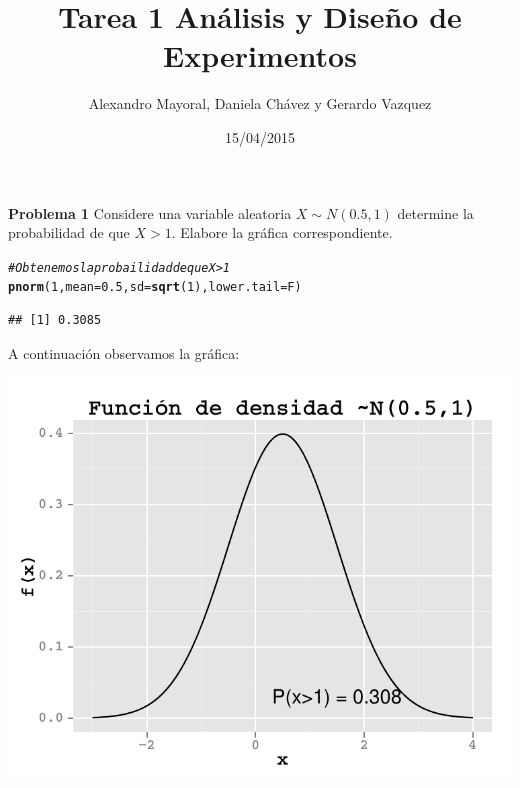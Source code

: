 \documentclass[a4paper]{scrartcl}\usepackage[]{graphicx}\usepackage[]{color}
\author{Alexandro Mayoral, Daniela Chávez y Gerardo Vazquez}
\title{Tarea 1 Análisis y Diseño de Experimentos}
\date{15/04/2015}
\makeatletter
\def\maxwidth{ %
  \ifdim\Gin@nat@width>\linewidth
    \linewidth
  \else
    \Gin@nat@width
  \fi
}
\newcommand{\hlnum}[1]{\textcolor[rgb]{0.686,0.059,0.569}{#1}}%
\newcommand{\hlcom}[1]{\textcolor[rgb]{0.678,0.584,0.686}{\textit{#1}}}%
\newcommand{\hlstd}[1]{\textcolor[rgb]{0.345,0.345,0.345}{#1}}%
\newcommand{\hlkwc}[1]{\textcolor[rgb]{0.333,0.667,0.333}{#1}}%
\newcommand{\hlkwd}[1]{\textcolor[rgb]{0.737,0.353,0.396}{\textbf{#1}}}%
\newenvironment{kframe}{%
 \def\at@end@of@kframe{}%
 \ifinner\ifhmode%
  \def\at@end@of@kframe{\end{minipage}}%
  \begin{minipage}{\columnwidth}%
 \fi\fi%
 \def\FrameCommand##1{\hskip\@totalleftmargin \hskip-\fboxsep
 \colorbox{shadecolor}{##1}\hskip-\fboxsep
     \hskip-\linewidth \hskip-\@totalleftmargin \hskip\columnwidth}%
 \MakeFramed {\advance\hsize-\width
   \@totalleftmargin\z@ \linewidth\hsize
   \@setminipage}}%
 {\par\unskip\endMakeFramed%
 \at@end@of@kframe}
\newenvironment{knitrout}{}{} %
\makeatother
\begin{document}
\maketitle




\textbf{Problema 1}
Considere una variable aleatoria $X \sim N(0.5, 1)$ determine la probabilidad de que $X>1$. Elabore la gráfica correspondiente.

\begin{knitrout}
\color{fgcolor}\begin{kframe}
\begin{alltt}
\hlcom{# Obtenemos la probailidad de que X > 1}
\hlkwd{pnorm}\hlstd{(}\hlnum{1}\hlstd{,} \hlkwc{mean} \hlstd{=} \hlnum{0.5}\hlstd{,} \hlkwc{sd} \hlstd{=} \hlkwd{sqrt}\hlstd{(}\hlnum{1}\hlstd{),} \hlkwc{lower.tail} \hlstd{= F)}
\end{alltt}
\begin{verbatim}
## [1] 0.3085
\end{verbatim}
\end{kframe}
\end{knitrout}

\noindent A continuación observamos la gráfica:

\begin{knitrout}
\color{fgcolor}

{\centering \includegraphics[width=\maxwidth]{figure/unnamed-chunk-3} 

}



\end{knitrout}
\end{document}
